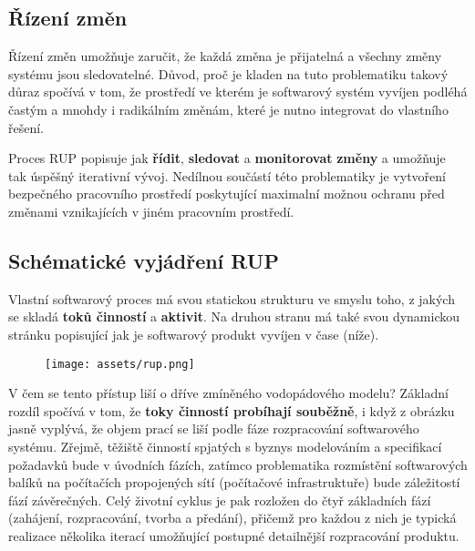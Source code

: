 \subsection{Řízení změn}
Řízení změn umožňuje zaručit, že každá změna je přijatelná a všechny změny systému jsou sledovatelné.
Důvod, proč je kladen na tuto problematiku takový důraz spočívá v tom, že prostředí ve kterém je softwarový systém  vyvíjen podléhá častým a mnohdy i radikálním změnám, které je nutno integrovat do vlastního řešení.

Proces RUP popisuje jak \textbf{řídit}, \textbf{sledovat} a \textbf{monitorovat} \textbf{změny} a umožňuje tak úspěšný iterativní vývoj.  Nedílnou součástí této problematiky je vytvoření bezpečného pracovního prostředí poskytující maximalní možnou ochranu před změnami vznikajících v jiném pracovním prostředí.


\subsection{Schématické vyjádření RUP}
Vlastní softwarový proces má svou statickou strukturu ve smyslu toho, z jakých se skladá \textbf{toků činností} a \textbf{aktivit}. Na druhou stranu má také svou dynamickou stránku popisující jak je softwarový produkt vyvíjen v čase (níže).

\begin{figure}[H]
    \centering
    \texttt{[image: assets/rup.png]}
\end{figure}

V čem se tento přístup liší o dříve zmíněného vodopádového modelu?  Základní rozdíl spočívá v tom, že \textbf{toky činností probíhají souběžně}, i když z obrázku jasně vyplývá, že objem prací se liší podle fáze rozpracování softwarového systému.  Zřejmě, těžiště činností spjatých s byznys modelováním a specifikací požadavků bude v úvodních fázích, zatímco problematika rozmístění softwarových balíků na počítačích propojených sítí (počítačové infrastruktuře) bude záležitostí fází závěrečných.  Celý životní cyklus je pak rozložen do čtyř základních fází (zahájení, rozpracování, tvorba a předání), přičemž pro každou z nich je typická realizace několika iterací umožňující postupné detailnější rozpracování produktu.


